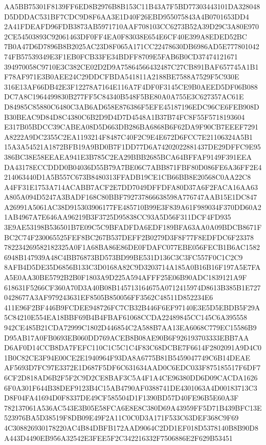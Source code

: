 \documentclass[UTF8,fontset=fandol,zihao=-4,a4paper]{ctexart}
\begin{document}
{{AA5BB75301F8139FF6ED8B2976B8B153C11B43A7F5BD77303443101DA328048D5DDDAC531BF7CDC9D8F6AA3E1D40F26EBD955075843A4B0701653DD4
2A41FDEAFD96FDB3873AB5971710AAF708103CC6273B52A39D29C3A80E9702CE54503893C92061463DF0FF4EA0F83038E654E6CF40E399A8EDED52BC
7B0A47D6D7896B8B2025AC23D8F065A171CC22478630DB6986AD5E77780104274FB57539349E3F1EB0FCB33FE34BDFF8709E5FAB6B0CD37474121671
394970058C9710E3C382CE02D2D9A75864566432487C27CB891BAF657745A1B1F78AF971E3B0AEE24C29DDCFBDA541811A2188BE7588A7529F5C930E
316E13AF66DB42E3F12278A7164E116A7F4DF0F3145CE9B0AEED5DF06B088DC7A8C1964499830B277FF5C84340B548F5BE80A0A755E3C627357AC61E
D84985C85880C6480C3AB6AD658E876386F5EFE45187196EDC96CE6FEB908DB30BEAC9D84D8C4380C6B2D9D4D7D4548A1B37B74FC8F55F5718193604
E317B05BDCC39CABEA08D5D663DB286BA6868B6F62DA9F90CB7EEEF7291A8222A9DC2355C2EA1193214F8487C40F2C9E4E672D6FCC7E21106324A5B1
15A3A54521A1872BFB19A9BD0B7F1DD77D6A74202022881437DE29DFFC9E95386BC38E58EEAEA941E3B785C2EA29BBB2685BCA64BFFAF9149F391EEA
DA43178ECCDDD0B04036D55B79A7BE06C7ABB871FBF80D086FE6A36FF2E4214063440D1A5B557C673B8480313FFADB19CE1CB66BB8E20568C0AA22C8
A4FF31E1753A714ACABB7ACF2E7DD7049DFFDFA80D37A6F2FACA16AA63A805A094D5247A3BADF168C80BBF792737866638598A776747AAB15E1DC847
A26991A5061AC38D915303906177FE485710B99E3F839A61F989034F370DD60A21AB4967A7E646AA96219B3F3725D95838CC93A5D56F311DCF4FD935
3E9AE53198B536501B7E09C5C9BFADFDA6EDF189BFA63AA0A09BDCB8671FBC2C74F230065525FEF8BC267B537DEFF2B0279D3F8F77F8EDFDC6F23378
782234269582182325A0F1A68BA86E86DE0FDAFC077EBE056FECB1B6AC15826948B147939A48C4BB76873BD573BD99BE531D136C3C3FC557F0C1C2C9
8AFB4D5DE35D6856B133C3D0168A82C9D3203714A185A0B16B16F197A5E7FAA5E0AA30BE5792B2B0F1803A9D225A594AFFF25E06B90ADC1839121A9F
618631F5266CF360A70D3A40B08B145713164675A0712415974D8613B385B1E7270428677A3AF979243631EF8505B850056FF3562C48511D852234E6
411E96F2BF446B9FCDEE948726FC7CB32B446F6EF97140E3E5D5EBDB5F29A5C84210E554EA18BBF69B4B4FBAF61068CCDA22489845CC145C6A395558
942CE485B21CDA72999C1802D446854C2A588B7AA13EA6068C779EC15586B9D95AB17A0FB0693EB060DD769ACEB8B08AE90B6F926193703333EBB7AA
D6AF0D14CCB8DA7FEFC110C1C5C1C4F83C68DCBE7F6614F2802091A9D4C01B0C82CE3F94E00CE2E1940964F93DA8A6775B81B5459047749C6B14DEAE
AF5693D7FC97E3372E1D687F5DF6C631634AAD0C6EDC033F875185517F6DF76CF2D818AD6B2F5F2C9D2CE8BAF3C5A4F1A4CE96380DD6D09CACDA1626
6F0A301F644B38DEF9123B4C15AB4790AF0388741DE4301063A4D00183713C3D8F04FA41694D0F8337DE49CF585504D1F1390BD57D40FE96B5E60A3F
782137061A536AC543E3B05E58FCA6E8E8C380D69A43959FF5D71B439BFC13E523976BA5D38519F8DB09E49F2A11C0C0D3A171F533C63DEF368C9F69
4C308826930178220AC4B84DBFB172AAD9064C2DD1EF018D5378140B8B90D8A443D4490EB956A32542E3FEE5F2C342216332F7506886E2F629B53451
}}
\end{document}
